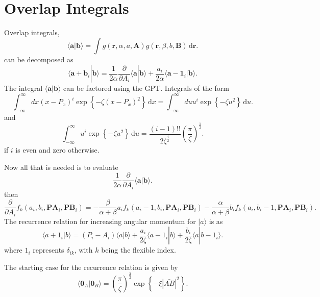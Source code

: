\section{Overlap Integrals}
Overlap integrals,
\[
	\langle \boldsymbol{a} | \boldsymbol{b} \rangle = \int g(\boldsymbol{r},\alpha, a, \boldsymbol{A}) g(\boldsymbol{r},\beta,b,\boldsymbol{B}) \, \mathrm{d}\boldsymbol{r} 
.\] 
can be decomposed as
\[
	\langle \boldsymbol{a}+\boldsymbol{b}_i | \boldsymbol{b} \rangle =\frac{1}{2\alpha}\frac{\partial }{\partial A_i} \langle \boldsymbol{a} | \boldsymbol{b} \rangle + \frac{a_i}{2\alpha} \langle \boldsymbol{a}-\boldsymbol{1}_i | \boldsymbol{b} \rangle 
.\] 
The integral $\langle \boldsymbol{a} | \boldsymbol{b} \rangle $ can be factored using the GPT.
Integrals of the form
\[
	\int ^\infty _{-\infty} dx (x-P_x)^i \exp \left\{ - \zeta (x-P_x)^2 \right\}  \, \mathrm{d}x = \int ^\infty_{-\infty} du u^i \exp \left\{ - \zeta u^2 \right\} \, \mathrm{d} u 
.\] 
and 
\[
	\int ^\infty_{-\infty}  u^i \exp \left\{ -\zeta u^2 \right\} \, \mathrm{d}u = \frac{(i-1)!!}{2\zeta^{\frac{i}{2}} }\left( \frac{\pi}{\zeta} \right) ^{\frac{1}{2}} 
.\] 
if $i$ is even and zero otherwise. 

Now all that is needed is to evaluate
\[
\frac{1}{2\alpha} \frac{\partial }{\partial A_i}  \langle \boldsymbol{a} | \boldsymbol{b} \rangle 
.\] 
then
\[
	\frac{\partial }{\partial A_i} f_k (a_i,b_i,\boldsymbol{PA}_i, \boldsymbol{PB}_i) = - \frac{\beta}{\alpha+\beta} a_i f_k (a_i-1,b_i,\boldsymbol{PA}_i,\boldsymbol{PB}_i) - \frac{\alpha}{\alpha + \beta} b_i f_k (a_i, b_i -1 , \boldsymbol{PA}_i,\boldsymbol{PB}_i)
.\] 
The recurrence relation for increasing angular momentum for $| a \rangle $ is as
\[
	\langle a+1_i | b \rangle = (P_i - A_i) \langle a | b \rangle + \frac{a_i}{2 \zeta} \langle a- 1_i | b \rangle + \frac{b_i}{2\zeta} \langle a | b-1_i \rangle 
.\] 
where $1_i$ represents  $\delta_{ik}$, with $k$ being the flexible index.

The starting case for the recurrence relation is given by
\[
	\langle \boldsymbol{0}_A | \boldsymbol{0}_B \rangle = \left( \frac{\pi}{\zeta} \right) ^{\frac{3}{2}} \exp \left\{ - \xi | \bar{AB} | ^2 \right\} 
.\] 

